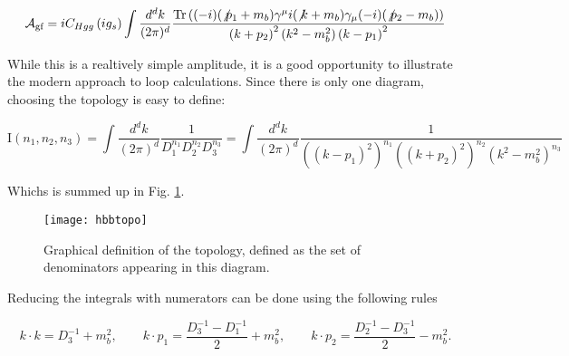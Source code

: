 \begin{equation}
  {\cal A}_\text{gf} = i C_{Hgg} \left( i g_s  \right) \int \frac{d^dk}{(2\pi)^d} \frac{
  \text{Tr}\left((-i)(\not p_1+m_b) \gamma^\mu i(\not k +m_b)\gamma_\mu  (-i)(\not p_2-m_b)\right)
  }{\left( k+p_2 \right)^2 \left( k^2-m_b^2 \right) \left(k-p_1 \right)^2   }
\end{equation}

While this is a realtively simple amplitude, it is a good opportunity to illustrate the modern approach to loop calculations. Since there is only one diagram, choosing the topology is easy to define:

\begin{equation}
  \text{I}\left( n_1,n_2,n_3 \right) = \int\frac{d^dk}{(2\pi)^d} \frac{1}{D_1^{n_1}D_2^{n_2}D_3^{n_3}} =\int\frac{d^dk}{(2\pi)^d} \frac{1}{{  \left(\left(k-p_1 \right)^2\right)^{n_1}\left(\left( k+p_2 \right)^2\right)^{n_2}\left( k^2-m_b^2 \right)^{n_3}}}
\end{equation}

Whichs is summed up in Fig. \ref{hbbtopo}.

\begin{figure}[!h]
  \centering
  \texttt{[image: hbbtopo]}
  \caption{Graphical definition of the topology, defined as the set of denominators appearing in this diagram.}
  \label{hbbtopo}
\end{figure}

Reducing the integrals with numerators can be done using the following rules

\begin{equation}
k\cdot k = D_3^{-1}+m_b^2 ,\hspace{2em} k\cdot p_1 = \frac{D_3^{-1}-D_1^{-1}}{2}+m_b^2  ,\hspace{2em}  k\cdot p_2 = \frac{D_2^{-1}-D_3^{-1}}{2}-m_b^2.
\end{equation}

